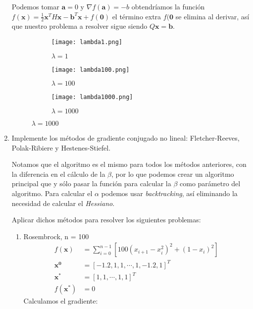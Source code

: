 \documentclass{article}
\begin{document}
\begin{enumerate}
Podemos tomar $\boldsymbol{a} = 0$ y $ \nabla f(\boldsymbol{a}) = -b$ obtendríamos la función $f(\boldsymbol{x}) = \frac{1}{2}\boldsymbol{x}^TH\boldsymbol{x} - \boldsymbol{b}^T\boldsymbol{x} + f(\boldsymbol{0})$ el término extra $f(\boldsymbol{0}$ se elimina al derivar, así que nuestro problema a resolver sigue siendo $Q\boldsymbol{x} = \boldsymbol{b}$.

\begin{figure}[ht]
\centering
\begin{subfigure}[b]{0.3\linewidth}
    \centering
    \texttt{[image: lambda1.png]}
    \caption{$\lambda = 1$}
    \label{fig:r2f1}
\end{subfigure}
\begin{subfigure}[b]{0.3\linewidth}
    \centering
    \texttt{[image: lambda100.png]}
    \caption{$\lambda = 100$}
    \label{fig:r2h1}
\end{subfigure}
\begin{subfigure}[b]{0.3\linewidth}
    \centering
    \texttt{[image: lambda1000.png]}
    \caption{$\lambda = 1000$}
    \label{fig:r2a1}
\end{subfigure}
\end{figure}
\newpage
\item  Implemente los métodos de gradiente conjugado no lineal: Fletcher-Reeves, Polak-Ribiere y Hestenes-Stiefel.

Notamos que el algoritmo es el mismo para todos los métodos anteriores, con la diferencia en el cálculo de la $\beta$, por lo que podemos crear un algoritmo principal que y sólo pasar la función para calcular la $\beta$ como parámetro del algoritmo. Para calcular el $\alpha$ podemos usar \emph{backtracking}, así eliminando la necesidad de calcular el \emph{Hessiano}.


Aplicar dichos métodos para resolver los siguientes problemas:

\begin{enumerate}
  \item Rosembrock, n = 100
  \begin{align*} 
  f(\boldsymbol{x}) &= \sum_{i=0}^{n-1}[100 (x_{i+1} - x_i^2)^2 + (1 - x_i)^2] \\
  \boldsymbol{x^0} &= [-1.2, 1, 1, \cdots, 1, -1.2, 1]^T \\
  \boldsymbol{x^*} &= [1, 1, \cdots, 1, 1]^T \\
  f(\boldsymbol{x^*}) &= 0
  \end{align*}
  Calculamos el gradiente:


\end{enumerate}
\end{enumerate}
\end{document}
